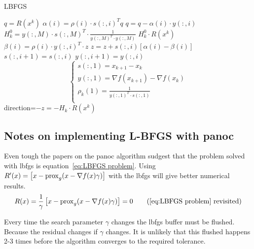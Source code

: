 		\begin{algorithm}
			\caption{LBFGS}
			\label{alg:LBFGS}
			\begin{algorithmic}[1]
				\State $q = R(x^k)$
				\State $\alpha(i)=\rho(i) \cdot s(:,i)^Tq$
				\State $q = q - \alpha(i) \cdot y(:,i)$
				\EndFor
				\State $H_k^0 = y(:,M) \cdot s(:,M)^T \cdot  \frac{1}{y(:,M)^T \cdot y(:,M)}$
				\State $H^0_k \cdot R(x^k)$
				\State $\beta(i) = \rho(i) \cdot y(:,i)^T \cdot z$
				\State $z = z + s(:,i)[\alpha(i)-\beta(i)]$
				\EndFor
				\State $s(:,i+1)=s(:,i)$
				\State $y(:,i+1)=y(:,i)$
				\EndFor
				\State $$\begin{cases}
				s(:,1) = x_{k+1} - x_k \\
				y(:,1) = \nabla f(x_{k+1}) - \nabla f(x_k)\\
				\rho_k(1) = \frac{1}{y(:,1)^T \cdot s(:,1)} \\ 
				\end{cases}
				$$
				\State \Return direction=$-z=-H_k \cdot R(x^k)$
				\EndProcedure
			\end{algorithmic}
		\end{algorithm}
	
	\subsection{Notes on implementing L-BFGS with panoc}
	Even tough the papers on the panoc algorithm sudgest that the problem solved with lbfgs is equation~\ref{eq:LBFGS problem}. Using $R'(x) = \left[ x - \operatorname{prox}_g( x - \nabla f(x)\gamma) \right]$ with the lbfgs will give better numerical results.
	\begin{equation}
	R(x) = \frac{1}{\gamma}\left[ x - \prox_g( x - \nabla f(x)\gamma) \right] = 0
	\tag{\ref{eq:LBFGS problem} revisited}
	\end{equation}
	
	Every time the search parameter $\gamma$ changes the lbfgs buffer must be flushed. Because the residual changes if $\gamma$ changes. It is unlikely that this flushed happens 2-3 times before the algorithm  converges to the required tolerance. 